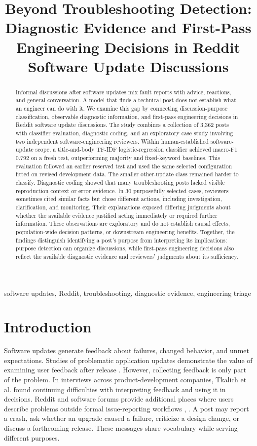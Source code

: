 \documentclass[conference,letterpaper]{IEEEtran}
\title{Beyond Troubleshooting Detection: Diagnostic Evidence and First-Pass Engineering Decisions in Reddit Software Update Discussions}
\author{\IEEEauthorblockN{Manu Mathew Jiss and Solomon Berhe}
\IEEEauthorblockA{School of Engineering and Computer Science\\
University of the Pacific, Stockton, California, USA\\
m\_jiss@u.pacific.edu, sberhe@pacific.edu}}
\begin{document}
\maketitle
\begin{abstract}
Informal discussions after software updates mix fault reports with advice, reactions, and general conversation. A model that finds a technical post does not establish what an engineer can do with it. We examine this gap by connecting discussion-purpose classification, observable diagnostic information, and first-pass engineering decisions in Reddit software update discussions. The study combines a collection of 3,362 posts with classifier evaluation, diagnostic coding, and an exploratory case study involving two independent software-engineering reviewers. Within human-established software-update scope, a title-and-body TF-IDF logistic-regression classifier achieved macro-F1 0.792 on a fresh test, outperforming majority and fixed-keyword baselines. This evaluation followed an earlier reserved test and used the same selected configuration fitted on revised development data. The smaller other-update class remained harder to classify. Diagnostic coding showed that many troubleshooting posts lacked visible reproduction context or error evidence. In 30 purposefully selected cases, reviewers sometimes cited similar facts but chose different actions, including investigation, clarification, and monitoring. Their explanations exposed differing judgments about whether the available evidence justified acting immediately or required further information. These observations are exploratory and do not establish causal effects, population-wide decision patterns, or downstream engineering benefits. Together, the findings distinguish identifying a post's purpose from interpreting its implications: purpose detection can organize discussions, while first-pass engineering decisions also reflect the available diagnostic evidence and reviewers' judgments about its sufficiency.
\end{abstract}
\begin{IEEEkeywords}
software updates, Reddit, troubleshooting, diagnostic evidence, engineering triage
\end{IEEEkeywords}
\section{Introduction}
Software updates generate feedback about failures, changed behavior, and unmet expectations. Studies of problematic application updates demonstrate the value of examining user feedback after release \cite{Hassan2020BadUpdates}. However, collecting feedback is only part of the problem. In interviews across product-development companies, Tkalich et al. \cite{Tkalich2025Feedback} found continuing difficulties with interpreting feedback and using it in decisions. Reddit and software forums provide additional places where users describe problems outside formal issue-reporting workflows \cite{Iqbal2021Reddit}, \cite{Wang2024Forums}. A post may report a crash, ask whether an upgrade caused a failure, criticize a design change, or discuss a forthcoming release. These messages share vocabulary while serving different purposes.
\end{document}
